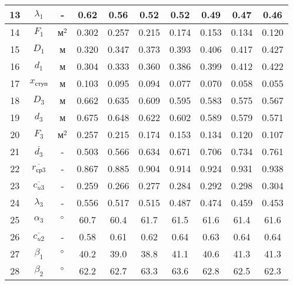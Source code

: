\begin{landscape}
\begin{center}
\begin{longtable}{|c|c|c|c|c|c|c|c|c|c|}
				13 & $\lambda_1$ & - & 0.62 & 0.56 & 0.52 & 0.52 & 0.49 & 0.47 & 0.46 \\\hline
			
				14 & $F_1$ & $м^2$ & 0.302 & 0.257 & 0.215 & 0.174 & 0.153 & 0.134 & 0.120 \\\hline
			
				15 & $D_1$ & м & 0.320 & 0.347 & 0.373 & 0.393 & 0.406 & 0.417 & 0.427 \\\hline
			
				16 & $d_1$ & м & 0.304 & 0.333 & 0.360 & 0.386 & 0.399 & 0.412 & 0.422 \\\hline
			
				17 & $x_{ступ}$ & м & 0.103 & 0.095 & 0.094 & 0.077 & 0.070 & 0.058 & 0.055 \\\hline
			
				18 & $D_3$ & м & 0.662 & 0.635 & 0.609 & 0.595 & 0.583 & 0.575 & 0.567 \\\hline
			
				19 & $d_3$ & м & 0.675 & 0.648 & 0.622 & 0.602 & 0.589 & 0.579 & 0.571 \\\hline
			
				20 & $F_3$ & $м^2$ & 0.257 & 0.215 & 0.174 & 0.153 & 0.134 & 0.120 & 0.107 \\\hline
			
				21 & $\overline{d_3}$ & - & 0.503 & 0.566 & 0.634 & 0.671 & 0.706 & 0.734 & 0.761 \\\hline
			
				22 & $\overline{r_{ср3}}$ & - & 0.867 & 0.885 & 0.904 & 0.914 & 0.924 & 0.931 & 0.938 \\\hline
			
				23 & $\overline{c_{u3}}$ & - & 0.259 & 0.266 & 0.277 & 0.284 & 0.292 & 0.298 & 0.304 \\\hline
			
				24 & $\lambda_3$ & - & 0.556 & 0.517 & 0.515 & 0.487 & 0.474 & 0.459 & 0.453 \\\hline
			
				25 & $\alpha_3$ & $\degree$ & 60.7 & 60.4 & 61.7 & 61.5 & 61.6 & 61.4 & 61.6 \\\hline
			
				26 & $\overline{c_{u2}}$ & - & 0.58 & 0.61 & 0.62 & 0.64 & 0.63 & 0.64 & 0.64 \\\hline
			
				27 & $\beta_1$ & $\degree$ & 40.2 & 39.0 & 38.8 & 41.1 & 40.6 & 41.3 & 41.3 \\\hline
			
				28 & $\beta_2$ & $\degree$ & 62.2 & 62.7 & 63.3 & 63.6 & 62.8 & 62.5 & 62.3 \\\hline
			

\end{longtable}
\end{center}
\end{landscape}
